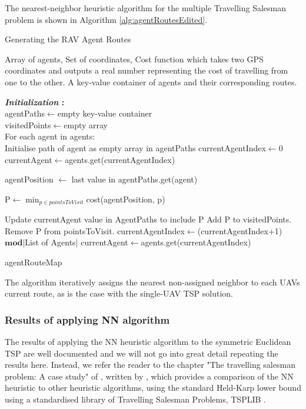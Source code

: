 The nearest-neighbor heuristic algorithm for the multiple Travelling Salesman problem is shown in Algorithm \ref{alg:agentRoutesEdited}.

\begin{algorithm}
\caption{Generating the RAV Agent Routes}
\label{alg:agentRoutesEdited}
\begin{algorithmic}[1]
\renewcommand{\algorithmicrequire}{\textbf{Input:}}
\renewcommand{\algorithmicensure}{\textbf{Output:}}
\REQUIRE Array of agents, Set of coordinates, Cost function which takes two GPS coordinates and outputs a real number representing the cost of travelling from one to the other. 
\ENSURE  A key-value container of agents and their corresponding routes.\\
\hfill\pagebreak

\noindent\textbf{\textit{\noindent Initialization} :}\\
agentPaths$\leftarrow$empty key-value container\\
visitedPoints$\leftarrow$empty array
\\
For each agent in agents:\\
\quad Initialise path of agent as empty array in agentPaths
currentAgentIndex$\leftarrow$0\\
currentAgent$\leftarrow$agents.get(currentAgentIndex)\\
\hfill\pagebreak


\STATE agentPosition $\leftarrow$ last value in agentPaths.get(agent)

\STATE P$\leftarrow$\(\displaystyle \min_{p \in pointsToVisit}\)cost(agentPosition, p)

\STATE Update currentAgent value in AgentPaths to include P
\STATE Add P to visitedPoints.
\STATE Remove P from pointsToVisit.
\STATE currentAgentIndex$\leftarrow$(currentAgentIndex+1) $\mathbf{mod}$$\vert$List of Agents$\vert$
\STATE currentAgent$\leftarrow$agents.get(currentAgentIndex)


\ENDWHILE
\RETURN agentRouteMap
\end{algorithmic} 
\end{algorithm}

The algorithm iteratively assigns the nearest non-assigned neighbor to each UAVs current route, as is the case with the single-UAV TSP solution.

\subsubsection{Results of applying NN algorithm}
The results of applying the NN heuristic algorithm to the symmetric Euclidean TSP are well documented and we will not go into great detail repeating the results here. Instead, we refer the reader to the chapter "The travelling salesman problem: A case study" of \cite{Aarts:1997:LSC:549160}, written by \citeauthor{Johnson1995TheOptimization}, which provides a comparison of the NN heuristic to other heuristic algorithms, using the standard Held-Karp lower bound \cite{Held1962AProblems} using a standardised library of Travelling Salesman Problems, TSPLIB \cite{TSPLIB}.

